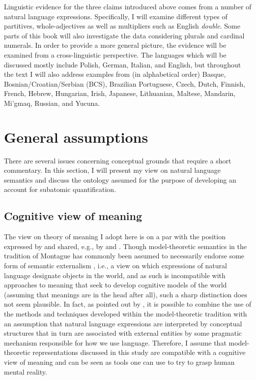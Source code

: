 Linguistic evidence for the three claims introduced above comes from a number of natural language expressions. Specifically, I will examine different types of partitives, whole-adjectives as well as multipliers such as English \textit{double}. Some parts of this book will also investigate the data considering plurals and cardinal numerals. In order to provide a more general picture, the evidence will be examined from a cross-linguistic perspective. The languages which will be discussed mostly include Polish, German, Italian, and English, but throughout the text I will also address examples from (in alphabetical order) Basque, Bosnian/Croatian/Serbian (BCS), Brazilian Portuguese, Czech, Dutch, Finnish, French, Hebrew, Hungarian, Irish, Japanese, Lithuanian, Maltese, Mandarin, Mi'gmaq, Russian, and Yucuna.

\section{General assumptions}\label{sec:general-assumptions}

There are several issues concerning conceptual grounds that require a short commentary. In this section, I will present my view on natural language semantics and discuss the ontology assumed for the purpose of developing an account for subatomic quantification. 

\subsection{Cognitive view of meaning}\label{sec:cognitive-view-of-meaning}

The view on theory of meaning I adopt here is on a par with the position expressed by \citet{krifka1998origins} and shared, e.g., by \citet{partee2018changing} and \citet{grimm2012number} \citep[see also][]{chomsky2000new}. Though model-theoretic semantics in the tradition of Montague has commonly been assumed to necessarily endorse some form of semantic externalism \citep[see, e.g.,][]{putnam1975meaning,davidson1987knowing}, i.e., a view on which expressions of natural language designate objects in the world, and as such is incompatible with approaches to meaning that seek to develop cognitive models of the world (assuming that meanings are in the head after all), such a sharp distinction does not seem plausible. In fact, as pointed out by \citeauthor{krifka1998origins}, it is possible to combine the use of the methods and techniques developed within the model-theoretic tradition with an assumption that natural language expressions are interpreted by conceptual structures that in turn are associated with external entities by some pragmatic mechanism responsible for how we use language. Therefore, I assume that model-theoretic representations discussed in this study are compatible with a cognitive view of meaning and can be seen as tools one can use to try to grasp human mental reality. 

